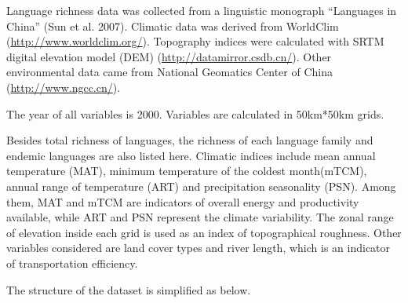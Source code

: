 \documentclass[12pt,]{article}
\begin{document}
Language richness data was collected from a linguistic monograph
``Languages in China'' (Sun et al. 2007). Climatic data was derived from
WorldClim (\url{http://www.worldclim.org/}). Topography indices were
calculated with SRTM digital elevation model (DEM)
(\url{http://datamirror.csdb.cn/}). Other environmental data came from
National Geomatics Center of China (\url{http://www.ngcc.cn/}).

The year of all variables is 2000. Variables are calculated in 50km*50km
grids.

Besides total richness of languages, the richness of each language
family and endemic languages are also listed here. Climatic indices
include mean annual temperature (MAT), minimum temperature of the
coldest month(mTCM), annual range of temperature (ART) and precipitation
seasonality (PSN). Among them, MAT and mTCM are indicators of overall
energy and productivity available, while ART and PSN represent the
climate variability. The zonal range of elevation inside each grid is
used as an index of topographical roughness. Other variables considered
are land cover types and river length, which is an indicator of
transportation efficiency.

The structure of the dataset is simplified as below.
\end{document}
